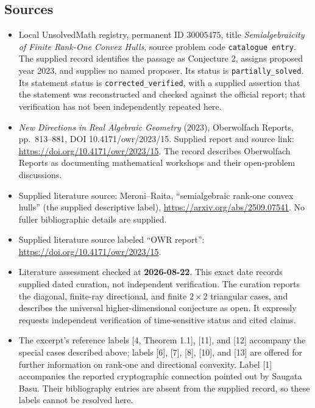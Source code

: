 \documentclass[11pt]{article}
\begin{document}
\subsection{Sources}
\begin{itemize}
\item Local UnsolvedMath registry, permanent ID \(30005475\), title \emph{Semialgebraicity of Finite Rank-One Convex Hulls}, source problem code \texttt{catalogue entry}. The supplied record identifies the passage as Conjecture 2, assigns proposed year 2023, and supplies no named proposer. Its status is \texttt{partially\_solved}. Its statement status is \texttt{corrected\_verified}, with a supplied assertion that the statement was reconstructed and checked against the official report; that verification has not been independently repeated here.
\item \emph{New Directions in Real Algebraic Geometry} (2023), Oberwolfach Reports, pp.\ 813--881, DOI 10.4171/owr/2023/15. Supplied report and source link: \url{https://doi.org/10.4171/owr/2023/15}. The record describes Oberwolfach Reports as documenting mathematical workshops and their open-problem discussions.
\item Supplied literature source: Meroni--Raita, ``semialgebraic rank-one convex hulls'' (the supplied descriptive label), \url{https://arxiv.org/abs/2509.07541}. No fuller bibliographic details are supplied.
\item Supplied literature source labeled ``OWR report'': \url{https://doi.org/10.4171/owr/2023/15}.
\item Literature assessment checked at \textbf{2026-08-22}. This exact date records supplied dated curation, not independent verification. The curation reports the diagonal, finite-ray directional, and finite \(2\times2\) triangular cases, and describes the universal higher-dimensional conjecture as open. It expressly requests independent verification of time-sensitive status and cited claims.
\item The excerpt's reference labels [4, Theorem 1.1], [11], and [12] accompany the special cases described above; labels [6], [7], [8], [10], and [13] are offered for further information on rank-one and directional convexity. Label [1] accompanies the reported cryptographic connection pointed out by Saugata Basu. Their bibliography entries are absent from the supplied record, so these labels cannot be resolved here.
\end{itemize}
\end{document}
